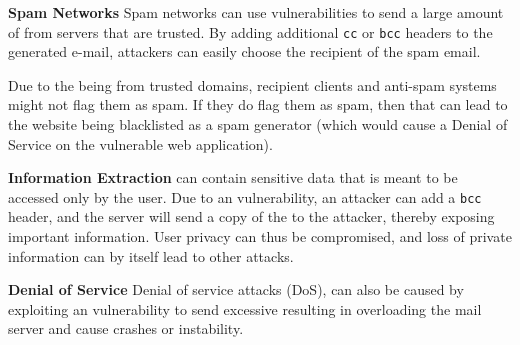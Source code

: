 \noindent\textbf{Spam Networks}
	Spam networks can use \ehi vulnerabilities to send a large amount of \email from servers that are trusted. By adding additional \texttt{cc} or \texttt{bcc} headers to the generated e-mail, attackers can easily choose the recipient of the spam email. 
	
	Due to the \email being from trusted domains, recipient \email clients and anti-spam systems might not flag them as spam. If they do flag them as spam, then that can lead to the website being blacklisted as a spam generator (which would cause a Denial of Service on the vulnerable web application). 
	
\noindent\textbf{Information Extraction}
	\Emails can contain sensitive data that is meant to be accessed only by the user. Due to an \ehi vulnerability, an attacker can add a \texttt{bcc} header, and the \email server will send a copy of the \email to the attacker, thereby exposing important information.
	User privacy can thus be compromised, and loss of private information can by itself lead to other attacks.

    \noindent\textbf{Denial of Service}
    Denial of service attacks (DoS), can also be caused by exploiting an \ehi vulnerability to send excessive \emails resulting in overloading the mail server and cause crashes or instability. 

